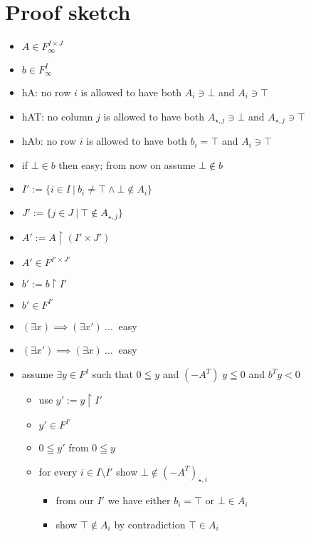 \documentclass[]{article}
\begin{document}
\section{Proof sketch}

\renewcommand{\labelitemi}{$\bullet$}
\renewcommand{\labelitemii}{$\bullet$}
\renewcommand{\labelitemiii}{$\bullet$}
\renewcommand{\labelitemiv}{$\bullet$}

\begin{itemize}
\item $ A \in F_\infty^{I \times J} $
\item $ b \in F_\infty^{I} $
\item hA: no row $i$ is allowed to have both $A_{i} \ni \bot$ and $A_{i} \ni \top$
\item hAT: no column $j$ is allowed to have both $A_{\star, j} \ni \bot$ and $A_{\star, j} \ni \top$
\item hAb: no row $i$ is allowed to have both $b_i = \top$ and $A_{i} \ni \top$
\item if $\bot \in b$ then easy; from now on assume $\bot \notin b$
\item $ I' := \{ i \in I ~|~ b_i \neq \top \wedge \bot \notin A_{i} \} $
\item $ J' := \{ j \in J ~|~ \top \notin A_{\star, j}  \} $
\item $ A' := A \restriction (I' \times J') $
\item $ A' \in F^{I' \times J'} $
\item $ b' := b \restriction I' $
\item $ b' \in F^{I'} $
\item $ (\exists x) \implies (\exists x') \ \dots \ $ easy
\item $ (\exists x') \implies (\exists x) \ \dots \ $ easy
\item assume $\exists y \in F^I$ such that $0 \leqq y$ and $(-A^T)\; y \leqq 0$ and $b^T y < 0$
\begin{itemize}
	\item use $y' := y \restriction I'$
	\item $ y' \in F^{I'} $
	\item $0 \leqq y'$ from $0 \leqq y$
	\item for every $i \in I \setminus I'$ show $ \bot \notin (-A^T)_{\star, i} $
	\begin{itemize}
		\item from our $I'$ we have either $ b_i = \top $ or $ \bot \in A_{i} $
		\item show $ \top \notin A_{i} $ by contradiction $ \top \in A_{i} $

\end{itemize}
\end{itemize}
\end{itemize}
\end{document}

